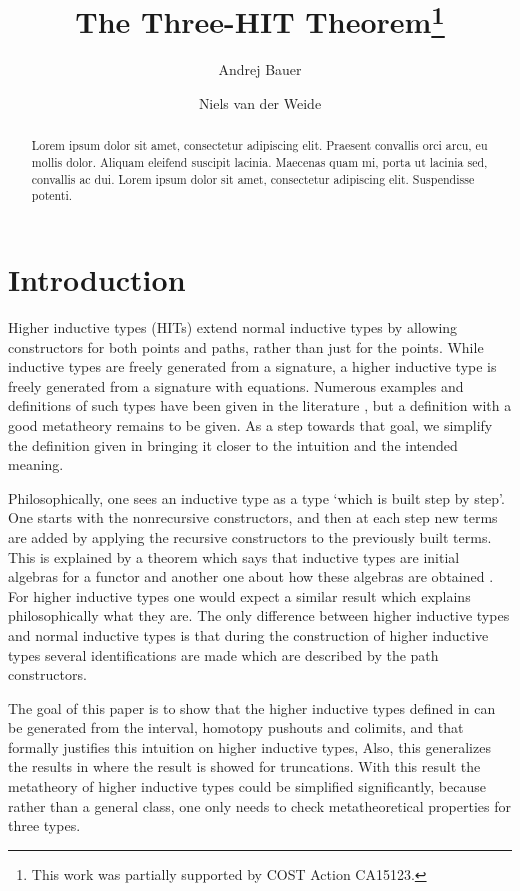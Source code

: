 \documentclass[a4paper,UKenglish]{lipics-v2016}
\title{The Three-HIT Theorem\footnote{This work was partially supported by COST Action CA15123.}}
\author[1]{Andrej Bauer}
\author[2]{Niels van der Weide}
\affil[1]{Department of Mathematics and Physics, University of Ljubljana, Ljubljana, Slovenia\\
  \texttt{Andrej.Bauer@andrej.com}}
\affil[2]{Department of Computer Science, Radboud University, Nijmegen, The Netherlands\\
  \texttt{nweide@cs.ru.nl}}
\begin{document}
\maketitle

\begin{abstract}
Lorem ipsum dolor sit amet, consectetur adipiscing elit. Praesent convallis orci arcu, eu mollis dolor. Aliquam eleifend suscipit lacinia. Maecenas quam mi, porta ut lacinia sed, convallis ac dui. Lorem ipsum dolor sit amet, consectetur adipiscing elit. Suspendisse potenti. 
 \end{abstract}

\section{Introduction}
Higher inductive types (HITs) extend normal inductive types by allowing constructors for both points and paths, rather than just for the points.
While inductive types are freely generated from a signature, a higher inductive type is freely generated from a signature with equations.
Numerous examples and definitions of such types have been given in the literature \cite{altenkirch2016quotient,awodey2012inductive,basoldhigher,sojakova2015higher,hottbook}, but a definition with a good metatheory remains to be given.
As a step towards that goal, we simplify the definition given in \cite{basoldhigher} bringing it closer to the intuition and the intended meaning.

Philosophically, one sees an inductive type as a type `which is built step by step'.
One starts with the nonrecursive constructors, and then at each step new terms are added by applying the recursive constructors to the previously built terms.
This is explained by a theorem which says that inductive types are initial algebras for a functor \cite{dybjer1994inductive,dybjer2003induction} and another one about how these algebras are obtained \cite{adamek1974free}.
For higher inductive types one would expect a similar result which explains philosophically what they are.
The only difference between higher inductive types and normal inductive types is that during the construction of higher inductive types several identifications are made which are described by the path constructors.

The goal of this paper is to show that the higher inductive types defined in \cite{basoldhigher} can be generated from the interval, homotopy pushouts and colimits, and that formally justifies this intuition on higher inductive types, 
Also, this generalizes the results in \cite{doorn2016constructing,kraus2014general,kraus2016constructions} where the result is showed for truncations.
With this result the metatheory of higher inductive types could be simplified significantly, because rather than a general class, one only needs to check metatheoretical properties for three types.
\end{document}
